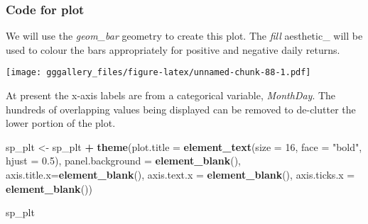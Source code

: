 \documentclass[]{book}
\newenvironment{Shaded}{\begin{snugshade}}{\end{snugshade}}
\newcommand{\DataTypeTok}[1]{\textcolor[rgb]{0.13,0.29,0.53}{#1}}
\newcommand{\DecValTok}[1]{\textcolor[rgb]{0.00,0.00,0.81}{#1}}
\newcommand{\FloatTok}[1]{\textcolor[rgb]{0.00,0.00,0.81}{#1}}
\newcommand{\KeywordTok}[1]{\textcolor[rgb]{0.13,0.29,0.53}{\textbf{#1}}}
\newcommand{\NormalTok}[1]{#1}
\newcommand{\OperatorTok}[1]{\textcolor[rgb]{0.81,0.36,0.00}{\textbf{#1}}}
\newcommand{\StringTok}[1]{\textcolor[rgb]{0.31,0.60,0.02}{#1}}
\begin{document}
\hypertarget{spfourcode}{%
\subsubsection*{Code for plot}\label{spfourcode}}

We will use the \emph{geom\_bar} geometry to create this plot. The \emph{fill} aesthetic\_ will be used to colour the bars appropriately for positive and negative daily returns.

\begin{Shaded}
\end{Shaded}

\texttt{[image: gggallery\_files/figure-latex/unnamed-chunk-88-1.pdf]}

At present the x-axis labels are from a categorical variable, \emph{MonthDay}. The hundreds of overlapping values being displayed can be removed to de-clutter the lower portion of the plot.

\begin{Shaded}
\begin{Highlighting}[]
\NormalTok{sp_plt <-}\StringTok{ }\NormalTok{sp_plt }\OperatorTok{+}\StringTok{ }
\StringTok{  }\KeywordTok{theme}\NormalTok{(}\DataTypeTok{plot.title =} \KeywordTok{element_text}\NormalTok{(}\DataTypeTok{size =} \DecValTok{16}\NormalTok{, }\DataTypeTok{face =} \StringTok{"bold"}\NormalTok{, }\DataTypeTok{hjust =} \FloatTok{0.5}\NormalTok{), }
        \DataTypeTok{panel.background =} \KeywordTok{element_blank}\NormalTok{(), }\DataTypeTok{axis.title.x=}\KeywordTok{element_blank}\NormalTok{(), }
        \DataTypeTok{axis.text.x =}  \KeywordTok{element_blank}\NormalTok{(), }\DataTypeTok{axis.ticks.x =} \KeywordTok{element_blank}\NormalTok{()) }

\NormalTok{sp_plt}
\end{Highlighting}
\end{Shaded}
\end{document}
